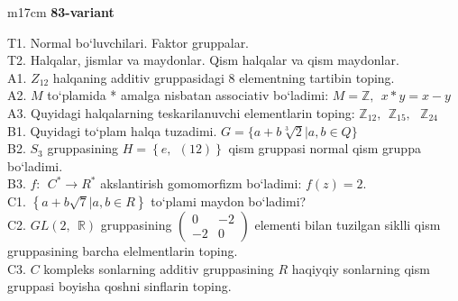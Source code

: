 \documentclass{article}
\begin{document}
\begin{tabular}{m{17cm}}
\textbf{83-variant}
\newline

T1. Normal bo`luvchilari. Faktor gruppalar. \\
T2. Halqalar, jismlar va maydonlar. Qism halqalar va qism maydonlar. \\
A1. \(Z_{12}\) halqaning additiv gruppasidagi 8 elementning tartibin toping. \\
A2. \(M\) to`plamida * amalga nisbatan associativ bo`ladimi: \(M\mathbb{= Z},\ \ x*y = x - y\) \\
A3. Quyidagi halqalarning teskarilanuvchi elementlarin toping: \(\mathbb{Z}_{12},\ \ \mathbb{Z}_{15},\ \ \ \mathbb{Z}_{24}\) \\
B1. Quyidagi to`plam halqa tuzadimi. \(G = \{ a + b\sqrt[3]{2}|a,b \in Q\}\) \\
B2. \(S_{3}\) gruppasining \(H = \left\{ e,\ \ (12) \right\}\) qism gruppasi normal qism gruppa bo`ladimi. \\
B3. \(f:\ \ C^{*} \rightarrow R^{*}\) akslantirish gomomorfizm bo`ladimi: \(f(z) = 2.\) \\
C1. \(\left\{ a + b\sqrt{7}|a,b \in R \right\}\) to`plami maydon bo`ladimi? \\
C2. \(GL(2,\mathbb{\ \ R})\) gruppasining \(\begin{pmatrix}
0 & - 2 \\
 - 2 & 0
\end{pmatrix}\) elementi bilan tuzilgan siklli qism gruppasining barcha elelmentlarin toping. \\
C3. \(C\) kompleks sonlarning additiv gruppasining \(R\) haqiyqiy sonlarning qism gruppasi boyisha qo\textquotesingle shni sinflarin toping. \\

\end{tabular}
\vspace{1cm}
\end{document}
